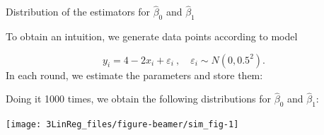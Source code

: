 \documentclass[10pt,ignorenonframetext,]{beamer}
\newenvironment{Shaded}{\begin{snugshade}}{\end{snugshade}}
\newcommand{\KeywordTok}[1]{\textcolor[rgb]{0.13,0.29,0.53}{\textbf{#1}}}
\newcommand{\DataTypeTok}[1]{\textcolor[rgb]{0.13,0.29,0.53}{#1}}
\newcommand{\DecValTok}[1]{\textcolor[rgb]{0.00,0.00,0.81}{#1}}
\newcommand{\FloatTok}[1]{\textcolor[rgb]{0.00,0.00,0.81}{#1}}
\newcommand{\StringTok}[1]{\textcolor[rgb]{0.31,0.60,0.02}{#1}}
\newcommand{\OtherTok}[1]{\textcolor[rgb]{0.56,0.35,0.01}{#1}}
\newcommand{\ControlFlowTok}[1]{\textcolor[rgb]{0.13,0.29,0.53}{\textbf{#1}}}
\newcommand{\OperatorTok}[1]{\textcolor[rgb]{0.81,0.36,0.00}{\textbf{#1}}}
\newcommand{\NormalTok}[1]{#1}
\begin{document}
\begin{frame}[fragile]

\begin{block}{Distribution of the estimators for \(\hat\beta_0\) and
\(\hat\beta_1\)}

\vspace{2mm} To obtain an intuition, we generate data points according
to model

\[y_i = 4 - 2x_i + \varepsilon_i \ , \quad \varepsilon_i\sim N(0,0.5^2). \]
In each round, we estimate the parameters and store them: \tiny

\begin{Shaded}
\end{Shaded}

\normalsize
Doing it 1000 times, we obtain the following distributions for
\(\hat\beta_0\) and \(\hat\beta_1\):

\begin{center}\texttt{[image: 3LinReg\_files/figure-beamer/sim\_fig-1]} \end{center}

\end{block}

\end{frame}
\end{document}

